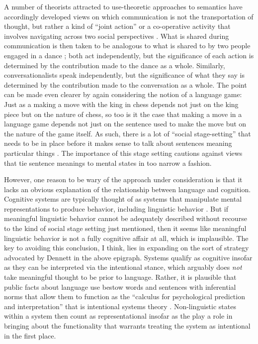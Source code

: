 A number of theorists attracted to use-theoretic approaches to semantics have accordingly developed views on which communication is not the transportation of thought, but rather a kind of ``joint action'' \citep{Clark:1996} or a co-operative activity that involves navigating across two social perspectives \citep{Brandom:1994}. What is shared during communication is then taken to be analogous to what is shared to by two people engaged in a dance \citep{Clark:1996,Brandom:2010}; both act independently, but the significance of each action is determined by the contribution made to the dance as a whole. Similarly, conversationalists speak independently, but the significance of what they say is determined by the contribution made to the conversation as a whole. The point can be made even clearer by again considering the notion of a language game: Just as a making a move with the king in chess depends not just on the king piece but on the nature of chess, so too is it the case that making a move in a language game depends not just on the sentence used to make the move but on the nature of the game itself. As such, there is a lot of ``social stage-setting'' that needs to be in place before it makes sense to talk about sentences meaning particular things \citep[][p. 461]{Brandom:1994}. The importance of this stage setting cautions against views that tie sentence meanings to mental states in too narrow a fashion. 

However, one reason to be wary of the approach under consideration is that it lacks an obvious explanation of the relationship between language and cognition. Cognitive systems are typically thought of as systems that manipulate mental representations to produce behavior, including linguistic behavior \citep{Thagard:2005}. But if meaningful linguistic behavior cannot be adequately described without recourse to the kind of social stage setting just mentioned, then it seems like meaningful linguistic behavior is not a fully cognitive affair at all, which is implausible. The key to avoiding this conclusion, I think, lies in expanding on the sort of strategy advocated by Dennett in the above epigraph. Systems qualify as cognitive insofar as they can be interpreted via the intentional stance, which arguably does \textit{not} take meaningful thought to be prior to language. Rather, it is plausible that public facts about language use bestow words and sentences with inferential norms that allow them to function as the ``calculus for psychological prediction and interpretation'' that is intentional systems theory \citep[][p. 58]{Dennett:1987}. Non-linguistic states within a system then count as representational insofar as the play a role in bringing about the functionality that warrants treating the system as intentional in the first place.

